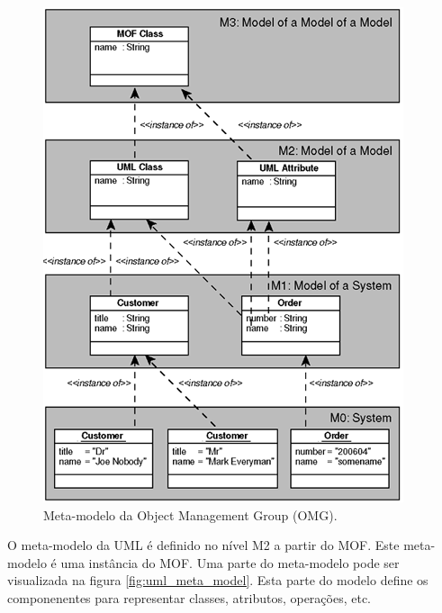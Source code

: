 \begin{figure}
	\centering
	\includegraphics{img/omg_meta_model.png}
	\caption{Meta-modelo da Object Management
	Group (OMG).}\label{fig:omg_meta_model}
\end{figure}

O meta-modelo da UML é definido no nível M2 a partir do MOF. Este meta-modelo é uma instância do MOF. Uma parte do meta-modelo pode ser visualizada na
figura \ref{fig:uml_meta_model}. Esta parte do modelo define os componenentes para representar classes, atributos, operações, etc.

